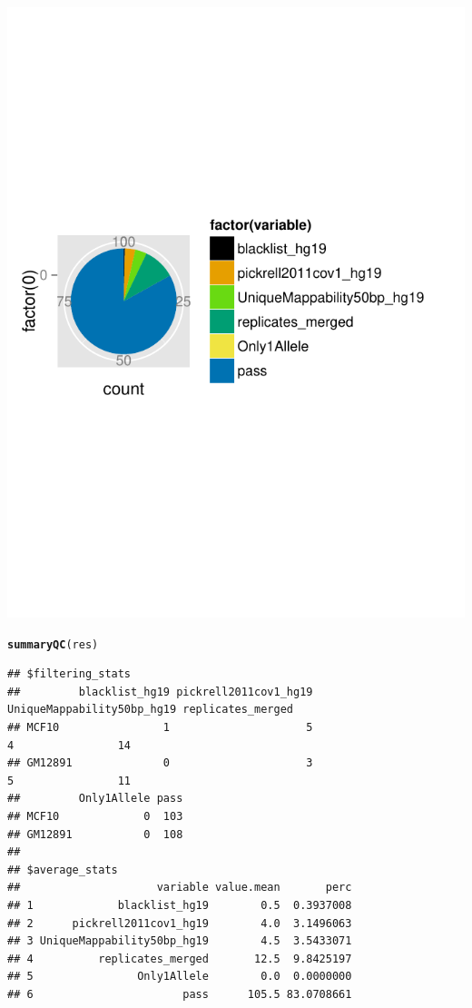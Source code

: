 \documentclass{article}\usepackage[]{graphicx}\usepackage[usenames,dvipsnames]{color}
\makeatletter
\def\maxwidth{ %
  \ifdim\Gin@nat@width>\linewidth
    \linewidth
  \else
    \Gin@nat@width
  \fi
}
\newcommand{\hlstd}[1]{\textcolor[rgb]{0.345,0.345,0.345}{#1}}%
\newcommand{\hlkwd}[1]{\textcolor[rgb]{0.737,0.353,0.396}{\textbf{#1}}}%
\newenvironment{kframe}{%
 \def\at@end@of@kframe{}%
 \ifinner\ifhmode%
  \def\at@end@of@kframe{\end{minipage}}%
  \begin{minipage}{\columnwidth}%
 \fi\fi%
 \def\FrameCommand##1{\hskip\@totalleftmargin \hskip-\fboxsep
 \colorbox{shadecolor}{##1}\hskip-\fboxsep
     \hskip-\linewidth \hskip-\@totalleftmargin \hskip\columnwidth}%
 \MakeFramed {\advance\hsize-\width
   \@totalleftmargin\z@ \linewidth\hsize
   \@setminipage}}%
 {\par\unskip\endMakeFramed%
 \at@end@of@kframe}
\newenvironment{knitrout}{}{} %
\makeatother
\begin{document}
\begin{knitrout}
{\centering \includegraphics[width=\maxwidth]{figure/QCplots-3} 

}


\begin{kframe}\begin{alltt}
\hlkwd{summaryQC}\hlstd{(res)}
\end{alltt}
\begin{verbatim}
## $filtering_stats
##         blacklist_hg19 pickrell2011cov1_hg19 UniqueMappability50bp_hg19 replicates_merged
## MCF10                1                     5                          4                14
## GM12891              0                     3                          5                11
##         Only1Allele pass
## MCF10             0  103
## GM12891           0  108
## 
## $average_stats
##                     variable value.mean       perc
## 1             blacklist_hg19        0.5  0.3937008
## 2      pickrell2011cov1_hg19        4.0  3.1496063
## 3 UniqueMappability50bp_hg19        4.5  3.5433071
## 4          replicates_merged       12.5  9.8425197
## 5                Only1Allele        0.0  0.0000000
## 6                       pass      105.5 83.0708661
\end{verbatim}
\end{kframe}
\end{knitrout}
\end{document}
